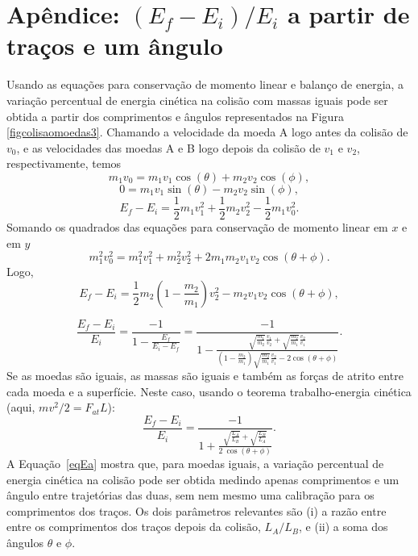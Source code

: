 \chapter{Apêndice: $(E_f-E_i)/E_i$ a partir de traços e um ângulo}
\label{deltaE}


\vspace{-0.5cm}

Usando as equações para conservação de momento linear e balanço de energia, a variação percentual de energia cinética na colisão com massas iguais pode ser obtida a partir dos comprimentos e ângulos representados na Figura \ref{figcolisaomoedas3}. Chamando a velocidade da moeda A logo antes da colisão de $v_0$, e as velocidades das moedas A e B logo depois da colisão de $v_1$ e $v_2$, respectivamente, temos
\begin{equation}
    m_1 v_0 = m_1 v_1 \cos(\theta) + m_2 v_2 \cos(\phi),
\end{equation}
\begin{equation}
    0 = m_1 v_1 \sin(\theta) - m_2 v_2 \sin(\phi),
\end{equation}
\begin{equation}
    E_f - E_i = \frac{1}{2} m_1 v_1^2 +  \frac{1}{2} m_2 v_2^2 -  \frac{1}{2} m_1 v_0^2.
\end{equation}
Somando os quadrados das equações para conservação de momento linear em $x$ e em $y$
\begin{equation}
    m_1^2 v_0^2 = m_1^2 v_1^2  + m_2^2 v_2^2 + 2 m_1 m_2 v_1 v_2 \cos(\theta+\phi).
\end{equation}
Logo,
\begin{equation}
    E_f - E_i =   \frac{1}{2} m_2 \left(1-\frac{m_2}{m_1}\right) v_2^2  -  m_2 v_1 v_2 \cos(\theta+\phi),
\end{equation}

\begin{equation}
   \frac{ E_f - E_i}{E_i} =\frac{-1}{1-\frac{E_f}{E_i-E_f}}
   =\frac{-1}{1-
   \displaystyle {\frac{     \sqrt{\frac{m_1}{m_2}}\frac{v_1}{v_2} + \sqrt{\frac{m_2}{m_1}}\frac{v_2}{v_1}    }
   {    \left(1-\frac{m_2}{m_1}\right) \sqrt{\frac{m_2}{m_1}}\frac{v_2}{v_1} -2 \cos(\theta+\phi)}}  
   }.
\end{equation}
Se as moedas são iguais, as massas são iguais e também as forças de atrito entre cada moeda e a superfície. Neste caso, usando o teorema trabalho-energia cinética (aqui, $mv^2/2=F_{at} L$):
\begin{equation}
\frac{E_f - E_i}{E_i} = \frac{-1}{1+\displaystyle {\frac{\sqrt{\frac{L_A}{L_B}}+\sqrt{\frac{L_B}{L_A}}}{2~ \cos(\theta+\phi)}}}.
\label{eqEa}
\end{equation}
A Equação~\ref{eqEa} mostra que, para moedas iguais, a variação percentual de energia cinética na colisão pode ser obtida medindo apenas comprimentos e um ângulo entre trajetórias das duas, sem nem mesmo uma calibração para os comprimentos dos traços. Os dois parâmetros relevantes são (i) a razão entre entre os comprimentos dos traços depois da colisão, $L_A/L_B$, e (ii) a soma dos ângulos $\theta$ e $\phi$.  

